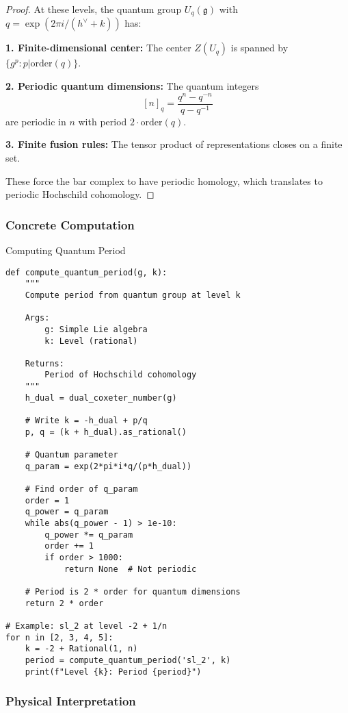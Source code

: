 \begin{proof}
At these levels, the quantum group $U_q(\mathfrak{g})$ with $q = \exp(2\pi i/(h^{\vee} + k))$ has:

\textbf{1. Finite-dimensional center:} The center $Z(U_q)$ is spanned by $\{g^p : p | \text{order}(q)\}$.

\textbf{2. Periodic quantum dimensions:} The quantum integers
\[
[n]_q = \frac{q^n - q^{-n}}{q - q^{-1}}
\]
are periodic in $n$ with period $2\cdot\text{order}(q)$.

\textbf{3. Finite fusion rules:} The tensor product of representations closes on a finite set.

These force the bar complex to have periodic homology, which translates to periodic Hochschild cohomology.
\end{proof}

\subsubsection{Concrete Computation}

\begin{algorithm}
\caption{Computing Quantum Period}
\begin{verbatim}
def compute_quantum_period(g, k):
    """
    Compute period from quantum group at level k
    
    Args:
        g: Simple Lie algebra
        k: Level (rational)
    
    Returns:
        Period of Hochschild cohomology
    """
    h_dual = dual_coxeter_number(g)
    
    # Write k = -h_dual + p/q
    p, q = (k + h_dual).as_rational()
    
    # Quantum parameter
    q_param = exp(2*pi*i*q/(p*h_dual))
    
    # Find order of q_param
    order = 1
    q_power = q_param
    while abs(q_power - 1) > 1e-10:
        q_power *= q_param
        order += 1
        if order > 1000:
            return None  # Not periodic
    
    # Period is 2 * order for quantum dimensions
    return 2 * order

# Example: sl_2 at level -2 + 1/n
for n in [2, 3, 4, 5]:
    k = -2 + Rational(1, n)
    period = compute_quantum_period('sl_2', k)
    print(f"Level {k}: Period {period}")
\end{verbatim}
\end{algorithm}

\subsubsection{Physical Interpretation}

